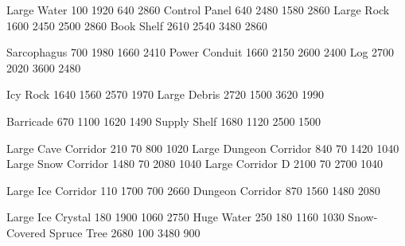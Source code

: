 \def\tilejpg{terrain-002.jpg}

  {Large Water} {100 1920 640 2860}
  {Control Panel{\qm}} {640 2480 1580 2860}
  {Large Rock{\qm}} {1600 2450 2500 2860}
  {Book Shelf} {2610 2540 3480 2860}

  {Sarcophagus} {700 1980 1660 2410}
  {Power Conduit{\qm}} { 1660 2150 2600 2400}
  {Log} { 2700 2020 3600 2480}

  {Icy Rock{\qm}} {1640 1560 2570 1970}
  {Large Debris} {2720 1500 3620 1990}

  {Barricade} {670 1100 1620 1490}
  {Supply Shelf} {1680 1120 2500 1500}

  {Large Cave Corridor{\qm}} {210 70 800 1020}
  {Large Dungeon Corridor{\qm}} {840 70 1420 1040}
  {Large Snow Corridor} {1480 70 2080 1040}
  {Large Corridor D{\qm}} {2100 70 2700 1040}

\def\tilejpg{annotated-002.jpg}

  {Large Ice Corridor{\qm}} { 110 1700 700 2660}
  {Dungeon Corridor{\qm}} { 870 1560 1480 2080}

\def\tilejpg{terrain-004.jpg}

\lgice         {} {Large Ice Crystal} { 180 1900 1060 2750}
\hugewater     {} {Huge Water} {250 180 1160 1030}
 {Snow-Covered Spruce Tree{\qm}} { 2680 100 3480 900}
